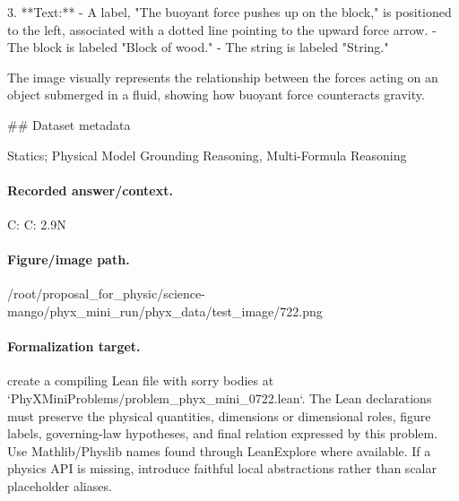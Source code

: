3. **Text:**
   - A label, "The buoyant force pushes up on the block," is positioned to the left, associated with a dotted line pointing to the upward force arrow.
   - The block is labeled "Block of wood."
   - The string is labeled "String."

The image visually represents the relationship between the forces acting on an object submerged in a fluid, showing how buoyant force counteracts gravity.

\#\# Dataset metadata

Statics; Physical Model Grounding Reasoning, Multi-Formula Reasoning

\paragraph{Recorded answer/context.}
C: C: 2.9N

\paragraph{Figure/image path.}
/root/proposal\_for\_physic/science-mango/phyx\_mini\_run/phyx\_data/test\_image/722.png

\paragraph{Formalization target.}
create a compiling Lean file with sorry bodies at `PhyXMiniProblems/problem\_phyx\_mini\_0722.lean`. The Lean declarations must preserve the physical quantities, dimensions or dimensional roles, figure labels, governing-law hypotheses, and final relation expressed by this problem.
Use Mathlib/Physlib names found through LeanExplore where available. If a physics API is missing, introduce faithful local abstractions rather than scalar placeholder aliases.


